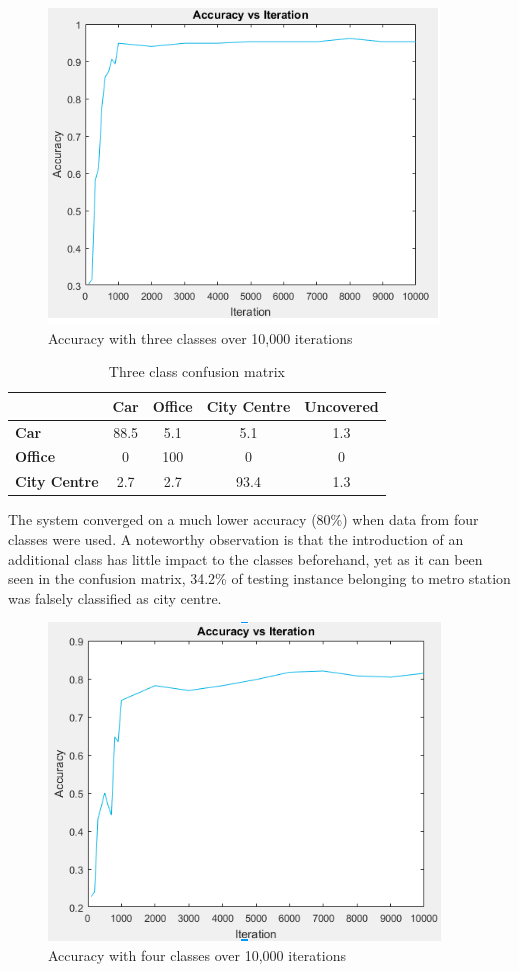 \documentclass[11pt]{article}
\begin{document}
\begin{figure}[!htbp]
	\centering
	\includegraphics[width=0.5\linewidth]{yiyang_figures/2.png}
	\caption{Accuracy with three classes over 10,000 iterations}
	\label{fig:threeClass}
\end{figure}

\begin{table}[!htbp]
	\centering
	\caption{Three class confusion matrix}
	\label{tab:conf3}
	\begin{tabularx}{0.68\textwidth}{lcccc}
		\toprule
		                     & \textbf{Car} & \textbf{Office} & \textbf{City Centre} & \textbf{Uncovered} \\ \midrule
		    \textbf{Car}     &     88.5     & 5.1             & 5.1                  & 1.3                \\
		  \textbf{Office}    &      0       & 100             & 0                    & 0                  \\
		\textbf{City Centre} &     2.7      & 2.7             & 93.4                 & 1.3                \\ \bottomrule
	\end{tabularx}
\end{table}






The system converged on a much lower accuracy (80\%) when data from four classes were used. A noteworthy observation is that the introduction of an additional class has little impact to the classes beforehand, yet as it can been seen in the confusion matrix, 34.2\% of testing instance belonging to metro station was falsely classified as city centre.

\begin{figure}[!htbp]
	\centering
	\includegraphics[width=0.6\linewidth]{yiyang_figures/3.png}
	\caption{Accuracy with four classes over 10,000 iterations}
	\label{fig:fourClass}
\end{figure}
\end{document}
